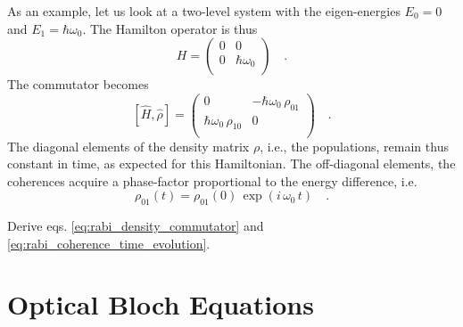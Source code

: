 As an example, let us look at a two-level system with the eigen-energies $E_0= 0$ and $E_1 = \hbar \omega_0$. The Hamilton operator is thus
\begin{equation}
 H  = \begin{pmatrix}
  0 & 0 \\ 0 & \hbar \omega_0 \\
 \end{pmatrix} \quad .
\end{equation}
The commutator becomes
\begin{equation}
 \left[ \hat{H}, \hat{\rho}\right] = 
 \begin{pmatrix}
 0 & - \hbar \omega_0 \, \rho_{01} \\   \hbar \omega_0 \, \rho_{10} & 0 \\
 \end{pmatrix} \quad . \label{eq:rabi_density_commutator}
\end{equation}
The  diagonal elements of the density matrix $\rho$, i.e., the populations, remain thus constant in time, as expected for this Hamiltonian. The off-diagonal elements, the coherences acquire a phase-factor proportional to the energy difference, i.e.
\begin{equation}
 \rho_{01}(t) =  \rho_{01}(0) \, \exp \left(i \, \omega_0 \, t \right)  \quad . \label{eq:rabi_coherence_time_evolution}
\end{equation}



\begin{questions}
\item Derive eqs. \ref{eq:rabi_density_commutator} and \ref{eq:rabi_coherence_time_evolution}.
\end{questions}


\section{Optical Bloch Equations}


